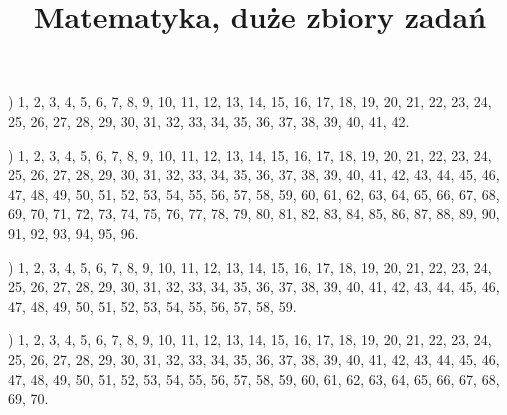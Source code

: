 \documentclass[a4paper,11pt]{article}
\title{Matematyka, duże zbiory zadań}
\begin{document}





\maketitle %







\noindent
{}) 1, 2, 3, 4, 5, 6, 7, 8, 9, 10, 11, 12, 13, 14, 15,
16, 17, 18, 19, 20, 21, 22, 23, 24, 25, 26, 27, 28, 29, 30, 31, 32,
33, 34, 35, 36, 37, 38, 39, 40, 41, 42.

\vspace{\spaceFour}



\noindent
{}) 1, 2, 3, 4, 5, 6, 7, 8, 9, 10, 11, 12, 13, 14, 15,
16, 17, 18, 19, 20, 21, 22, 23, 24, 25, 26, 27, 28, 29, 30, 31, 32,
33, 34, 35, 36, 37, 38, 39, 40, 41, 42, 43, 44, 45, 46, 47, 48, 49,
50, 51, 52, 53, 54, 55, 56, 57, 58, 59, 60, 61, 62, 63, 64, 65, 66,
67, 68, 69, 70, 71, 72, 73, 74, 75, 76, 77, 78, 79, 80, 81, 82, 83,
84, 85, 86, 87, 88, 89, 90, 91, 92, 93, 94, 95, 96.

\vspace{\spaceFour}



\noindent
{}) 1, 2, 3, 4, 5, 6, 7, 8, 9, 10, 11, 12, 13, 14, 15,
16, 17, 18, 19, 20, 21, 22, 23, 24, 25, 26, 27, 28, 29, 30, 31, 32,
33, 34, 35, 36, 37, 38, 39, 40, 41, 42, 43, 44, 45, 46, 47, 48, 49,
50, 51, 52, 53, 54, 55, 56, 57, 58, 59.

\vspace{\spaceFour}



\noindent
{}) 1, 2, 3, 4, 5, 6, 7, 8, 9, 10, 11, 12, 13, 14, 15,
16, 17, 18, 19, 20, 21, 22, 23, 24, 25, 26, 27, 28, 29, 30, 31, 32,
33, 34, 35, 36, 37, 38, 39, 40, 41, 42, 43, 44, 45, 46, 47, 48, 49,
50, 51, 52, 53, 54, 55, 56, 57, 58, 59, 60, 61, 62, 63, 64, 65, 66,
67, 68, 69, 70.

\vspace{\spaceFour}
\end{document}
